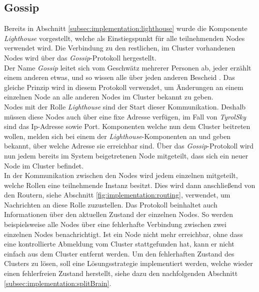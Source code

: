 \subsection{Gossip}
\label{subsec:implementation:gossip}
Bereits in Abschnitt \ref{subsec:implementation:lighthouse} wurde die Komponente \textit{Lighthouse} vorgestellt, welche als Einstiegspunkt für alle teilnehmenden Nodes verwendet wird. Die Verbindung zu den restlichen, im Cluster vorhandenen Nodes wird über das \textit{Gossip}-Protokoll hergestellt. \\
Der Name \textit{Gossip} leitet sich vom Geschwätz mehrerer Personen ab, jeder erzählt einem anderen etwas, und so wissen alle über jeden anderen Bescheid \citep{Akka.netCommunityAkka.NETDocumentation}. Das gleiche Prinzip wird in diesem Protokoll verwendet, um Änderungen an einem einzelnen Node an alle anderen Nodes im Cluster bekannt zu geben. \\
% 
% 
Nodes mit der Rolle \textit{Lighthouse} sind der Start dieser Kommunikation. Deshalb müssen diese Nodes auch über eine fixe Adresse verfügen, im Fall von \textit{TyrolSky} sind das Ip-Adresse sowie Port. Komponenten welche nun dem Cluster beitreten wollen, melden sich bei einem der \textit{Lighthouse}-Komponenten an und geben bekannt, über welche Adresse sie erreichbar sind. Über das \textit{Gossip}-Protokoll wird nun jedem bereits im System beigetretenen Node mitgeteilt, dass sich ein neuer Node im Cluster befindet. \\
In der Kommunikation zwischen den Nodes wird jedem einzelnen mitgeteilt, welche Rollen eine teilnehmende Instanz besitzt. Dies wird dann anschließend von den Routern, siehe Abschnitt \ref{fig:implementation:routing}, verwendet, um Nachrichten an diese Rolle zuzustellen. Das Protokoll beinhaltet auch Informationen über den aktuellen Zustand der einzelnen Nodes. So werden beispielsweise alle Nodes über eine fehlerhafte Verbindung zwischen zwei einzelnen Nodes benachrichtigt. Ist ein Node nicht mehr erreichbar, ohne dass eine kontrollierte Abmeldung vom Cluster stattgefunden hat, kann er nicht einfach aus dem Cluster entfernt werden. Um den fehlerhaften Zustand des Clusters zu lösen, soll eine Lösungsstrategie implementiert werden, welche wieder einen fehlerfreien Zustand herstellt, siehe dazu den nachfolgenden Abschnitt \ref{subsec:implementation:splitBrain}. \\ 
